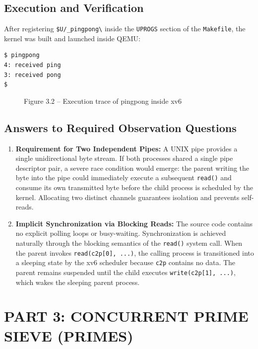 \documentclass[12pt,a4paper]{report}
\numberwithin{equation}{chapter}
\numberwithin{figure}{chapter}
\numberwithin{table}{chapter}
\begin{document}
\section{Execution and Verification}
After registering \texttt{\$U/\_pingpong\textbackslash} inside the \texttt{UPROGS} section of the \texttt{Makefile}, the kernel was built and launched inside QEMU:

\begin{lstlisting}[language=bash]
$ pingpong
4: received ping
3: received pong
$ 
\end{lstlisting}

\begin{figure}[H]
\centering
\caption{Figure 3.2 -- Execution trace of pingpong inside xv6}
\end{figure}

\section{Answers to Required Observation Questions}
\begin{enumerate}
    \item \textbf{Requirement for Two Independent Pipes:}
    A UNIX pipe provides a single unidirectional byte stream. If both processes shared a single pipe descriptor pair, a severe race condition would emerge: the parent writing the byte into the pipe could immediately execute a subsequent \texttt{read()} and consume its own transmitted byte before the child process is scheduled by the kernel. Allocating two distinct channels guarantees isolation and prevents self-reads.
    \item \textbf{Implicit Synchronization via Blocking Reads:}
    The source code contains no explicit polling loops or busy-waiting. Synchronization is achieved naturally through the blocking semantics of the \texttt{read()} system call. When the parent invokes \texttt{read(c2p[0], ...)}, the calling process is transitioned into a sleeping state by the xv6 scheduler because \texttt{c2p} contains no data. The parent remains suspended until the child executes \texttt{write(c2p[1], ...)}, which wakes the sleeping parent process.
\end{enumerate}

\chapter{PART 3: CONCURRENT PRIME SIEVE (PRIMES)}
\end{document}
